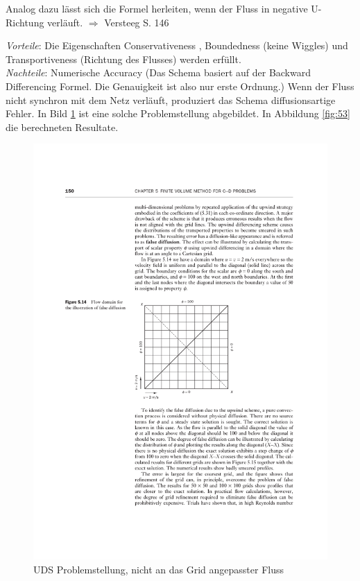 \documentclass[a4paper]{scrartcl}
\begin{document}
Analog dazu lässt sich die Formel herleiten, wenn der Fluss in negative
U-Richtung verläuft. $\Rightarrow$ Versteeg S. 146

\textit{Vorteile}: Die Eigenschaften Conservativeness , Boundedness (keine
Wiggles) und Transportiveness (Richtung des Flusses) werden erfüllt. \\
\textit{Nachteile}: Numerische Accuracy (Das Schema basiert auf der
Backward Differencing Formel. Die Genauigkeit ist also nur erste Ordnung.) Wenn
der Fluss nicht synchron mit dem Netz verläuft, produziert das Schema
diffusionsartige Fehler. In Bild \ref{fig:54} ist eine solche Problemstellung
abgebildet. In Abbildung \ref{fig:53} die berechneten Resultate.

\begin{figure}[h!]
\begin{center}
\includegraphics[scale=1.0]{images/54.pdf}
\caption{UDS Problemstellung, nicht an das Grid angepasster Fluss}
\label{fig:54}
\end{center}
\end{figure}
\end{document}
